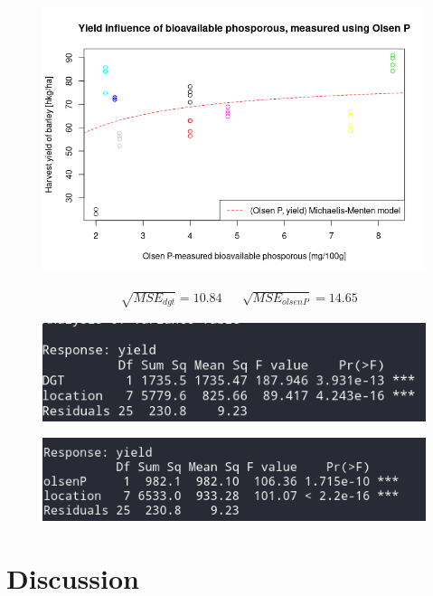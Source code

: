 \documentclass[12pt,fleqn]{article}
\begin{document}
\begin{figure}[H]
	\centering
	\includegraphics[width=.8\linewidth]{oP_mm}
\end{figure}

\begin{align*}
	& \sqrt{MSE_{dgt}}	 = 10.84
	&& \sqrt{MSE_{olsenP}} = 14.65
\end{align*}



\begin{figure}[H]
	\centering
	\includegraphics[width=.7\linewidth]{anovaDGT}
\end{figure}
\begin{figure}[H]
	\centering
	\includegraphics[width=.7\linewidth]{anovaOP}
\end{figure}

\section{Discussion}
\end{document}
